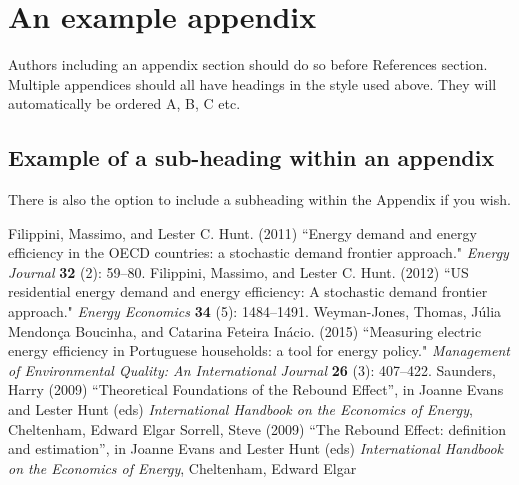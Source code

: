 \documentclass[3p,times,procedia]{elsarticle}
\begin{document}
\appendix
\section{An example appendix}
Authors including an appendix section should do so before References section. Multiple appendices should all have headings in the style used above. They will automatically be ordered A, B, C etc.

\subsection{Example of a sub-heading within an appendix}
There is also the option to include a subheading within the Appendix if you wish.


%
%




 \begin{thebibliography}{}


{F}ilippini, Massimo, and Lester C. Hunt. (2011) ``Energy demand and
energy efficiency in the OECD countries: a stochastic demand frontier
approach." {\it Energy Journal} {\bf 32} (2): 59--80.
Filippini, Massimo, and Lester C. Hunt. (2012) ``US residential
energy demand and energy efficiency: A stochastic demand frontier
approach." {\it Energy Economics} {\bf 34} (5): 1484--1491.
Weyman-Jones, Thomas, J\'{u}lia Mendon\c{c}a Boucinha, and Catarina
Feteira In\'{a}cio. (2015) ``Measuring electric energy efficiency in
Portuguese households: a tool for energy policy." {\it Management of Environmental Quality: An International Journal} {\bf 26} (3): 407--422.
\bibitem{} 
Saunders, Harry (2009) ``Theoretical Foundations of the Rebound Effect'', in Joanne Evans and Lester Hunt (eds) {\it International Handbook on the Economics of Energy}, Cheltenham, Edward Elgar
\bibitem{} 
Sorrell, Steve (2009) ``The Rebound Effect: definition and estimation'', in Joanne Evans and Lester Hunt (eds) {\it International Handbook on the Economics of Energy}, Cheltenham, Edward Elgar 
 \end{thebibliography}
\end{document}
